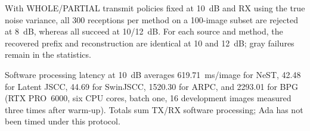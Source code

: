 With WHOLE/PARTIAL transmit policies fixed at 10~dB and RX using the true noise variance, all 300 receptions per method on a 100-image subset are rejected at 8~dB, whereas all succeed at 10/12~dB. For each source and method, the recovered prefix and reconstruction are identical at 10 and 12~dB; gray failures remain in the statistics.

Software processing latency at 10~dB averages 619.71~ms/image for NeST, 42.48 for Latent JSCC, 44.69 for SwinJSCC, 1520.30 for ARPC, and 2293.01 for BPG (RTX PRO~6000, six CPU cores, batch one, 16 development images measured three times after warm-up). Totals sum TX/RX software processing; Ada has not been timed under this protocol.

